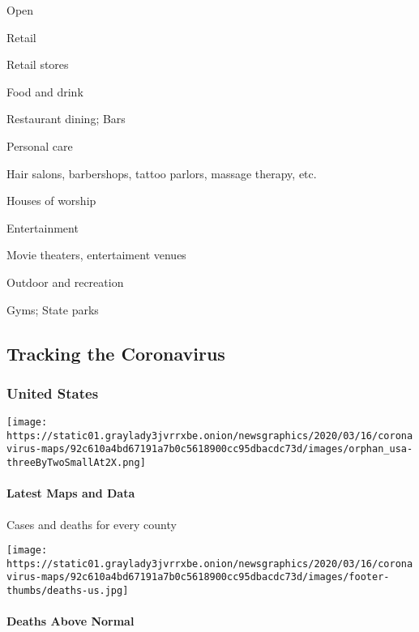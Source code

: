 Open

Retail

Retail stores

Food and drink

Restaurant dining; Bars

Personal care

Hair salons, barbershops, tattoo parlors, massage therapy, etc.

Houses of worship

Entertainment

Movie theaters, entertaiment venues

Outdoor and recreation

Gyms; State parks

\hypertarget{tracking-the-coronavirus}{%
\subsection{Tracking the Coronavirus}\label{tracking-the-coronavirus}}

\hypertarget{united-states}{%
\subsubsection{United States}\label{united-states}}

\href{https://www.nytimes3xbfgragh.onion/interactive/2020/us/coronavirus-us-cases.html}{}

\texttt{[image: https://static01.graylady3jvrrxbe.onion/newsgraphics/2020/03/16/coronavirus-maps/92c610a4bd67191a7b0c5618900cc95dbacdc73d/images/orphan\_usa-threeByTwoSmallAt2X.png]}

\hypertarget{latest-maps-and-data}{%
\paragraph{Latest Maps and Data}\label{latest-maps-and-data}}

Cases and deaths for every county

\href{https://www.nytimes3xbfgragh.onion/interactive/2020/05/05/us/coronavirus-death-toll-us.html}{}

\texttt{[image: https://static01.graylady3jvrrxbe.onion/newsgraphics/2020/03/16/coronavirus-maps/92c610a4bd67191a7b0c5618900cc95dbacdc73d/images/footer-thumbs/deaths-us.jpg]}

\hypertarget{deaths-above-normal}{%
\paragraph{Deaths Above Normal}\label{deaths-above-normal}}

